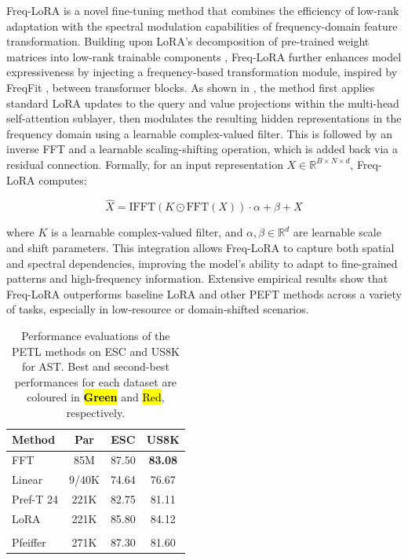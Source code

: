\documentclass[11pt]{article}
\begin{document}
Freq-LoRA is a novel fine-tuning method that combines the efficiency of low-rank adaptation with the spectral modulation capabilities of frequency-domain feature transformation. Building upon LoRA's decomposition of pre-trained weight matrices into low-rank trainable components \cite{hu2021lora}, Freq-LoRA further enhances model expressiveness by injecting a frequency-based transformation module, inspired by FreqFit \cite{ly2024enhancing}, between transformer blocks. As shown in , the method first applies standard LoRA updates to the query and value projections within the multi-head self-attention sublayer, then modulates the resulting hidden representations in the frequency domain using a learnable complex-valued filter. This is followed by an inverse FFT and a learnable scaling-shifting operation, which is added back via a residual connection. Formally, for an input representation $X \in \mathbb{R}^{B \times N \times d}$, Freq-LoRA computes:

\begin{equation} \hat{X} = \text{IFFT}(K \odot \text{FFT}(X)) \cdot \alpha + \beta + X \end{equation}

where $K$ is a learnable complex-valued filter, and $\alpha, \beta \in \mathbb{R}^d$ are learnable scale and shift parameters. This integration allows Freq-LoRA to capture both spatial and spectral dependencies, improving the model's ability to adapt to fine-grained patterns and high-frequency information. Extensive empirical results show that Freq-LoRA outperforms baseline LoRA and other PEFT methods across a variety of tasks, especially in low-resource or domain-shifted scenarios.

\begingroup
\setlength{\tabcolsep}{3.3pt}

\begin{table}[t]
\centering
\caption{Performance evaluations of the PETL methods on ESC and US8K for AST. 
Best and second-best performances for each dataset are coloured in 
\hl{\textbf{Green}} and 
\hl{Red}, respectively.}
\label{tab:main}
\begin{tabular}{lKKK}
\toprule
\textbf{Method} & \textbf{Par} & \textbf{ESC} & \textbf{US8K}\\
\midrule
FFT &  85M & 87.50 & \textbf{83.08}\\
Linear     & 9/40K   & 74.64      & 76.67\\
\hline \addlinespace
Pref-T 24  & 221K    & 82.75      & 81.11\\ 
LoRA       & 221K    & 85.80      & 84.12\\
\hline
{}
\\
\hline \addlinespace
Pfeiffer   & 271K    & 87.30 & 81.60\\
\bottomrule
\end{tabular}
\end{table}
\endgroup
\end{document}
